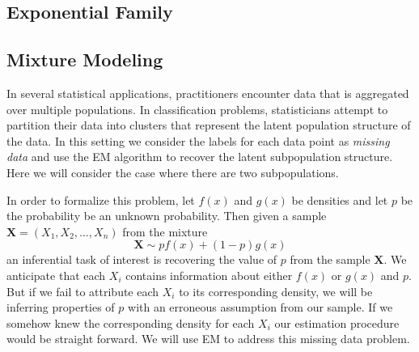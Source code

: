 \documentclass{article}
\begin{document}
\subsection{Exponential Family}

\subsection{Mixture Modeling}

In several statistical applications, practitioners encounter data that is aggregated over multiple populations. In classification problems, statisticians attempt to partition their data into clusters that represent the latent population structure of the data. In this setting we consider the labels for each data point as \textit{missing data} and use the EM algorithm to recover the latent subpopulation structure. Here we will consider the case where there are two subpopulations. 

In order to formalize this problem, let $f(x)$ and $g(x)$ be densities and let $p$ be the probability be an unknown probability. Then given a sample $\mathbf{X} = (X_1, X_2, \ldots, X_n)$ from the mixture $$\mathbf{X}\sim pf(x) + (1-p)g(x)$$ an inferential task of interest is recovering the value of $p$ from the sample $\mathbf{X}$. We anticipate that each $X_i$ contains information about either $f(x)$ or $g(x)$ and $p$. But if we fail to attribute each $X_i$ to its corresponding density, we will be inferring properties of $p$ with an erroneous assumption from our sample. If we somehow knew the corresponding density for each $X_i$ our estimation procedure would be straight forward. We will use EM to address this missing data problem. 
\end{document}
